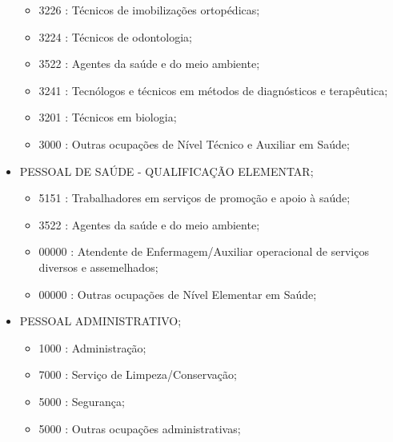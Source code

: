 \begin{itemize}
\begin{itemize}
    \item 3226 : Técnicos de imobilizações ortopédicas;
    \item 3224 : Técnicos de odontologia;
    \item 3522 : Agentes da saúde e do meio ambiente;
    \item 3241 : Tecnólogos e técnicos em métodos de diagnósticos e terapêutica;
    \item 3201 : Técnicos em biologia;
    \item 3000 : Outras ocupações de Nível Técnico e Auxiliar em Saúde;
  \end{itemize}
  \item PESSOAL DE SAÚDE - QUALIFICAÇÃO ELEMENTAR;
  \begin{itemize}
    \item 5151 : Trabalhadores em serviços de promoção e apoio à saúde;
    \item 3522 : Agentes da saúde e do meio ambiente;
    \item 00000 : Atendente de Enfermagem/Auxiliar operacional de serviços diversos e assemelhados;
    \item 00000 : Outras ocupações de Nível Elementar em Saúde;
  \end{itemize}
  \item PESSOAL ADMINISTRATIVO;
  \begin{itemize}
    \item 1000 : Administração;
    \item 7000 : Serviço de Limpeza/Conservação;
    \item 5000 : Segurança;
    \item 5000 : Outras ocupações administrativas;
  \end{itemize}
\end{itemize}
